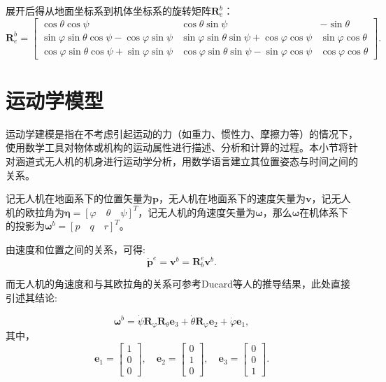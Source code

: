 展开后得从地面坐标系到机体坐标系的旋转矩阵$\boldsymbol{R}_{e}^{b}$：
\begin{equation}
\boldsymbol{R}_{e}^{b} = 
\begin{bmatrix}
\cos\theta\cos\psi & \cos\theta\sin\psi & -\sin\theta \\
\sin\varphi\sin\theta\cos\psi - \cos\varphi\sin\psi & \sin\varphi\sin\theta\sin\psi + \cos\varphi\cos\psi & \sin\varphi\cos\theta \\
\cos\varphi\sin\theta\cos\psi + \sin\varphi\sin\psi & \cos\varphi\sin\theta\sin\psi - \sin\varphi\cos\psi & \cos\varphi\cos\theta
\end{bmatrix}.
\end{equation}

\section{运动学模型}
运动学建模是指在不考虑引起运动的力（如重力、惯性力、摩擦力等）的情况下，使用数学工具对物体或机构的运动属性进行描述、分析和计算的过程。本小节将针对涵道式无人机的机身进行运动学分析，用数学语言建立其位置姿态与时间之间的关系。

记无人机在地面系下的位置矢量为$\boldsymbol{p}$，无人机在地面系下的速度矢量为$\boldsymbol{v}$，记无人机的欧拉角为$\boldsymbol{\eta}=[\varphi \quad \theta \quad \psi]^T$，记无人机的角速度矢量为$\boldsymbol{\omega}$，那么$\boldsymbol{\omega}$在机体系下的投影为$\boldsymbol{\omega}^b = [p \quad q \quad r]^T$。

由速度和位置之间的关系，可得:
\begin{equation}
    \dot{\boldsymbol{p}}^e = \boldsymbol{v}^b = \boldsymbol{R}_b^e \boldsymbol{v}^b.
    \label{eq:d_pos}
\end{equation}

而无人机的角速度和与其欧拉角的关系可参考Ducard等人\cite{Ducard2009Flight}的推导结果，此处直接引述其结论:

\begin{equation}
\boldsymbol{\omega}^b = \dot{\psi} \boldsymbol{R}_\varphi \boldsymbol{R}_\theta \boldsymbol{e}_3 + \dot{\theta} \boldsymbol{R}_\varphi \boldsymbol{e}_2 + \dot{\varphi} \boldsymbol{e}_1,
\label{eq:eular_rate}
\end{equation}
其中，
\begin{equation}
\boldsymbol{e}_1 = 
\begin{bmatrix}
1 \\
0 \\
0
\end{bmatrix}, \quad \boldsymbol{e}_2 = 
\begin{bmatrix}
0 \\
1 \\
0
\end{bmatrix}, \quad \boldsymbol{e}_3 = 
\begin{bmatrix}
0 \\
0 \\
1
\end{bmatrix}.
\label{eq:unit_vector}
\end{equation}

